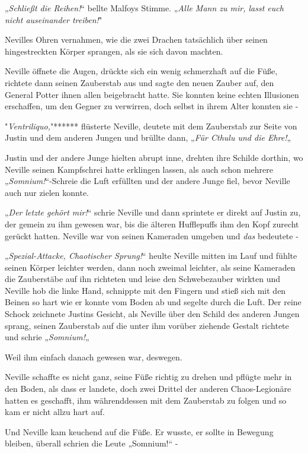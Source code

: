 {„\emph{Schließt die Reihen!}“ bellte Malfoys Stimme. „\emph{Alle Mann zu mir, lasst euch nicht auseinander treiben!}"

Nevilles Ohren vernahmen, wie die zwei Drachen tatsächlich über seinen hingestreckten Körper sprangen, als sie sich davon machten.

Neville öffnete die Augen, drückte sich ein wenig schmerzhaft auf die Füße, richtete dann seinen Zauberstab aus und sagte den neuen Zauber auf, den General Potter ihnen allen beigebracht hatte. Sie konnten keine echten Illusionen erschaffen, um den Gegner zu verwirren, doch selbst in ihrem Alter konnten sie -

"\emph{Ventriliquo,}"****** flüsterte Neville, deutete mit dem Zauberstab zur Seite von Justin und dem anderen Jungen und brüllte dann, „\emph{Für Cthulu und die Ehre!}„

Justin und der andere Junge hielten abrupt inne, drehten ihre Schilde dorthin, wo Neville seinen Kampfschrei hatte erklingen lassen, als auch schon mehrere „\emph{Somnium!}“-Schreie die Luft erfüllten und der andere Junge fiel, bevor Neville auch nur zielen konnte.

„\emph{Der letzte gehört mir!}“ schrie Neville und dann sprintete er direkt auf Justin zu, der gemein zu ihm gewesen war, bis die älteren Hufflepuffs ihm den Kopf zurecht gerückt hatten. Neville war von seinen Kameraden umgeben und \emph{das} bedeutete -

„\emph{Spezial-Attacke, Chaotischer Sprung!}“ heulte Neville mitten im Lauf und fühlte seinen Körper leichter werden, dann noch zweimal leichter, als seine Kameraden die Zauberstäbe auf ihn richteten und leise den Schwebezauber wirkten und Neville hob die linke Hand, schnippte mit den Fingern und stieß sich mit den Beinen so hart wie er konnte vom Boden ab und segelte durch die Luft. Der reine Schock zeichnete Justins Gesicht, als Neville über den Schild des anderen Jungen sprang, seinen Zauberstab auf die unter ihm vorüber ziehende Gestalt richtete und schrie „\emph{Somnium!}„

Weil ihm einfach danach gewesen war, deswegen.

Neville schaffte es nicht ganz, seine Füße richtig zu drehen und pflügte mehr in den Boden, als dass er landete, doch zwei Drittel der anderen Chaos-Legionäre hatten es geschafft, ihm währenddessen mit dem Zauberstab zu folgen und so kam er nicht allzu hart auf.

Und Neville kam keuchend auf die Füße. Er wusste, er sollte in Bewegung bleiben, überall schrien die Leute „Somnium!“ -

}
